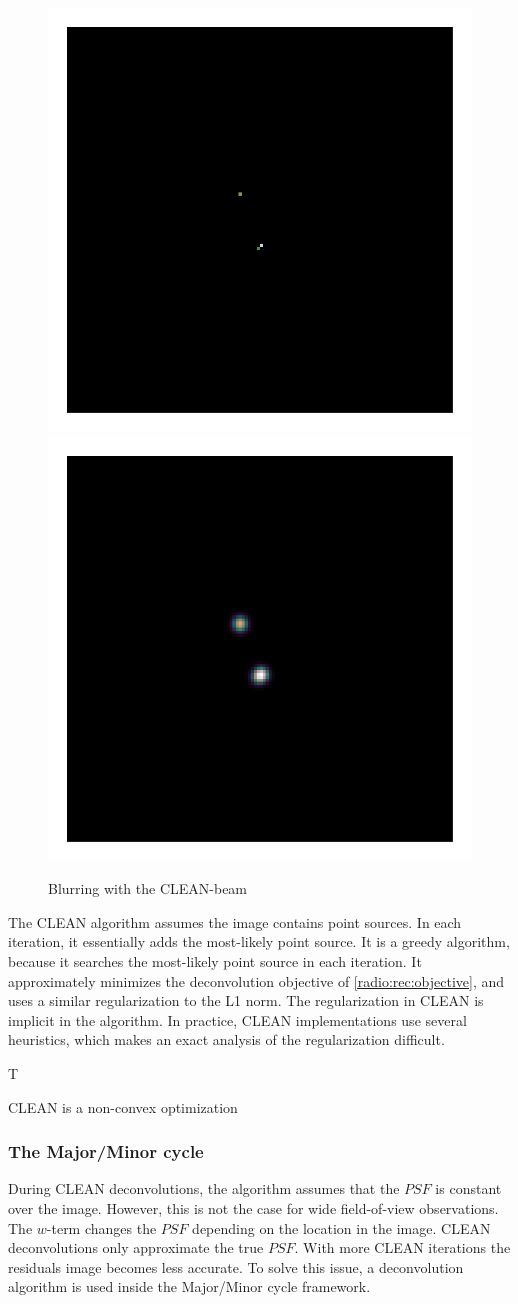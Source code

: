 \begin{figure}[h]
	\centering
	\includegraphics[width=0.25\linewidth, clip, trim= 1.0in 1.0in 1.0in 1.0in]{./chapters/01.intro/cleanExample/model_CLEAN_3.png}
	\includegraphics[width=0.25\linewidth, clip, trim= 1.0in 1.0in 1.0in 1.0in]{./chapters/01.intro/cleanExample/rec_CLEAN.png}
	\caption{Blurring with the CLEAN-beam}
	\label{radio:clean:beam}
\end{figure}

The CLEAN algorithm assumes the image contains point sources. In each iteration, it essentially adds the most-likely point source. It is a greedy algorithm, because it searches the most-likely point source in each iteration. It approximately minimizes the deconvolution objective of \eqref{radio:rec:objective}, and uses a similar regularization to the L1 norm. The regularization in CLEAN is implicit in the algorithm. In practice, CLEAN implementations use several heuristics, which makes an exact analysis of the regularization difficult.

T

CLEAN is a non-convex optimization

\subsubsection{The Major/Minor cycle}\label{intro2:opt:cycle}
During CLEAN deconvolutions, the algorithm assumes that the $PSF$ is constant over the image. However, this is not the case for wide field-of-view observations. The $w$-term changes the $PSF$ depending on the location in the image. CLEAN deconvolutions only approximate the true $PSF$. With more CLEAN iterations the residuals image becomes less accurate. To solve this issue, a deconvolution algorithm is used inside the Major/Minor cycle framework. 

